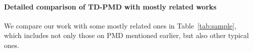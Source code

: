 \documentclass[10pt]{article}
\theoremstyle{plain}
\theoremstyle{definition}
\begin{document}
\paragraph{Detailed comparison of TD-PMD with mostly related works} 
{We compare our work with some mostly related ones in Table~\ref{tab:sample}, which includes not only those on PMD mentioned earlier, but also  other typical ones.
}
\end{document}
